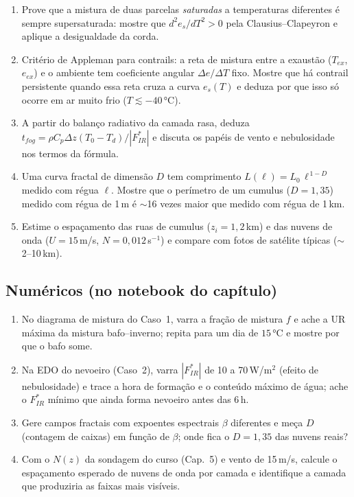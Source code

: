 \documentclass[11pt]{article}
\begin{document}
\begin{enumerate}[label=\textbf{T\arabic*.},itemsep=4pt]
  \item Prove que a mistura de duas parcelas \emph{saturadas} a
        temperaturas diferentes é sempre supersaturada: mostre que
        $d^2e_s/dT^2 > 0$ pela Clausius--Clapeyron e aplique a
        desigualdade da corda.
  \item Critério de Appleman para contrails: a reta de mistura entre a
        exaustão ($T_{ex}$, $e_{ex}$) e o ambiente tem coeficiente
        angular $\Delta e/\Delta T$ fixo. Mostre que há contrail
        persistente quando essa reta cruza a curva $e_s(T)$ e deduza por
        que isso só ocorre em ar muito frio ($T \lesssim -40\,°$C).
  \item A partir do balanço radiativo da camada rasa, deduza
        $t_{fog} = \rho C_p \Delta z (T_0-T_d)/|F^*_{IR}|$ e discuta os
        papéis de vento e nebulosidade nos termos da fórmula.
  \item Uma curva fractal de dimensão $D$ tem comprimento
        $L(\ell) = L_0\,\ell^{\,1-D}$ medido com régua $\ell$. Mostre
        que o perímetro de um cumulus ($D = 1{,}35$) medido com régua de
        1\,m é $\sim$16 vezes maior que medido com régua de 1\,km.
  \item Estime o espaçamento das ruas de cumulus ($z_i = 1{,}2$\,km) e
        das nuvens de onda ($U = 15$\,m/s, $N = 0{,}012$\,s$^{-1}$) e
        compare com fotos de satélite típicas ($\sim$2--10\,km).
\end{enumerate}

\subsection*{Numéricos (no notebook do capítulo)}

\begin{enumerate}[label=\textbf{N\arabic*.},itemsep=4pt]
  \item No diagrama de mistura do Caso~1, varra a fração de mistura $f$
        e ache a UR máxima da mistura bafo--inverno; repita para um dia
        de $15\,°$C e mostre por que o bafo some.
  \item Na EDO do nevoeiro (Caso~2), varra $|F^*_{IR}|$ de 10 a
        70\,W/m$^2$ (efeito de nebulosidade) e trace a hora de formação
        e o conteúdo máximo de água; ache o $F^*_{IR}$ mínimo que ainda
        forma nevoeiro antes das 6\,h.
  \item Gere campos fractais com expoentes espectrais $\beta$ diferentes
        e meça $D$ (contagem de caixas) em função de $\beta$; onde fica
        o $D = 1{,}35$ das nuvens reais?
  \item Com o $N(z)$ da sondagem do curso (Cap.~5) e vento de 15\,m/s,
        calcule o espaçamento esperado de nuvens de onda por camada e
        identifique a camada que produziria as faixas mais visíveis.
\end{enumerate}
\end{document}
